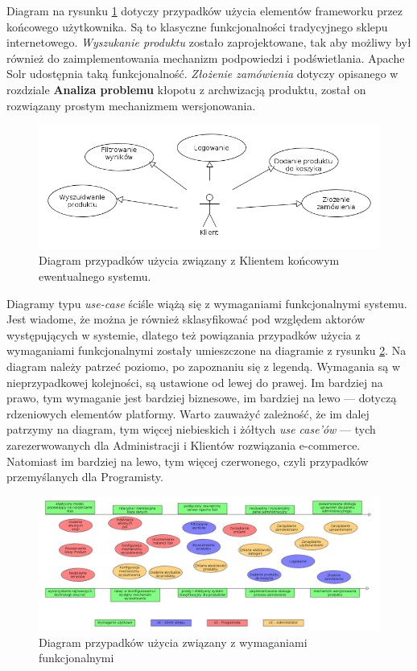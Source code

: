 Diagram na rysunku \ref{useCaseCustomer} dotyczy przypadków użycia elementów frameworku przez końcowego użytkownika. Są to klasyczne funkcjonalności tradycyjnego sklepu internetowego. \textit{Wyszukanie produktu} zostało zaprojektowane, tak aby możliwy był również do zaimplementowania mechanizm podpowiedzi i podświetlania. Apache Solr udostępnia taką funkcjonalność. \textit{Złożenie zamówienia} dotyczy opisanego w rozdziale \textbf{Analiza problemu} kłopotu z archwizacją produktu, został on rozwiązany prostym mechanizmem wersjonowania. 
\begin{figure}
	\begin{center}
		\includegraphics[width=1\textwidth]{uccustomer.png}
	\end{center}
	\caption{{\color{black}Diagram przypadków użycia związany z Klientem końcowym ewentualnego systemu.}} \label{useCaseCustomer}
\end{figure}

Diagramy typu \textit{use-case} ściśle wiążą się z wymaganiami funkcjonalnymi systemu. Jest wiadome, że można je również sklasyfikować pod względem aktorów występujących w systemie, dlatego też powiązania przypadków użycia z wymaganiami funkcjonalnymi zostały umieszczone na diagramie z rysunku \ref{wymtoUC}. Na diagram należy patrzeć poziomo, po zapoznaniu się z legendą. Wymagania są w nieprzypadkowej kolejności, są ustawione od lewej do prawej. Im bardziej na prawo, tym wymaganie jest bardziej biznesowe, im bardziej na lewo — dotyczą rdzeniowych elementów platformy. Warto zauważyć zależność, że im dalej patrzymy na diagram, tym więcej niebieskich i żółtych \textit{use case'ów} — tych zarezerwowanych dla Administracji i Klientów rozwiązania e-commerce. Natomiast im bardziej na lewo, tym więcej czerwonego, czyli przypadków przemyślanych dla Programisty.
\begin{figure}
	\begin{center}
		\includegraphics[angle=270,scale=0.4]{wymToUC.png}
	\end{center}
	\caption{{\color{black}Diagram przypadków użycia związany z wymaganiami funkcjonalnymi}} \label{wymtoUC}
\end{figure}


